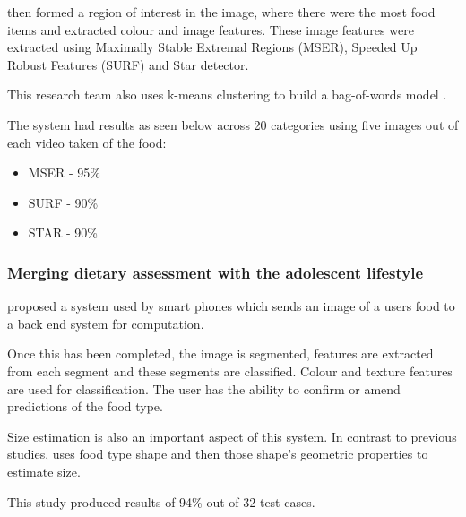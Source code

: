 \parencite{chen2010toward} then formed a region of interest in the image, where there were the most food items and extracted colour and image features.
These image features were extracted using Maximally Stable Extremal Regions (MSER), Speeded Up Robust Features (SURF) and Star detector.

This research team also uses k-means clustering to build a bag-of-words model \parencite{chen2010toward}.

The system had results as seen below across 20 categories using five images out of each video taken of the food:
\begin{itemize}
	\item{MSER - 95\%}
	\item{SURF - 90\%}
	\item{STAR - 90\%}
\end{itemize}




\subsubsection*{Merging dietary assessment with the adolescent lifestyle}
\parencite{schap2014merging} proposed a system used by smart phones which sends an image of a users food to a back end system for computation.

Once this has been completed, the image is segmented, features are extracted from each segment and these segments are classified.
Colour and texture features are used for classification.
The user has the ability to confirm or amend predictions of the food type.

Size estimation is also an important aspect of this system.
In contrast to previous studies, \parencite{snap} uses food type shape and then those shape's geometric properties to estimate size.

This study produced results of 94\% out of 32 test cases.
